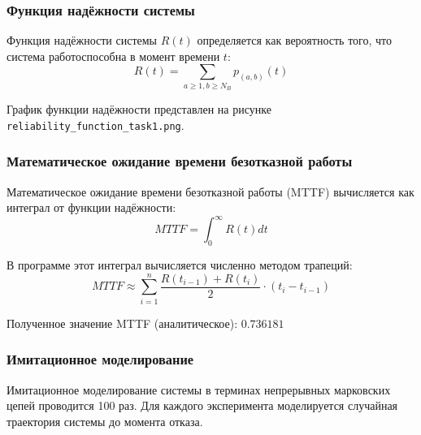 \subsubsection{Функция надёжности системы}

Функция надёжности системы $R(t)$ определяется как вероятность того, что система работоспособна в момент времени $t$:
\begin{equation}
R(t) = \sum_{a \geq 1, b \geq N_B} p_{(a,b)}(t)
\end{equation}

График функции надёжности представлен на рисунке \texttt{reliability\_function\_task1.png}.

\subsubsection{Математическое ожидание времени безотказной работы}

Математическое ожидание времени безотказной работы (MTTF) вычисляется как интеграл от функции надёжности:
\begin{equation}
MTTF = \int_{0}^{\infty} R(t) dt
\end{equation}

В программе этот интеграл вычисляется численно методом трапеций:
\begin{equation}
MTTF \approx \sum_{i=1}^{n} \frac{R(t_{i-1}) + R(t_i)}{2} \cdot (t_i - t_{i-1})
\end{equation}

Полученное значение MTTF (аналитическое): $0.736181$

\subsubsection{Имитационное моделирование}

Имитационное моделирование системы в терминах непрерывных марковских цепей проводится 100 раз. Для каждого эксперимента моделируется случайная траектория системы до момента отказа.

